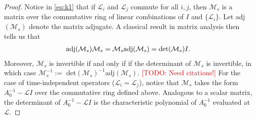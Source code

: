 \documentclass[review]{siamart}
\makeatletter
\newcommand{\todo}[1]{\textcolor{red}{[TODO\@: #1]}}
\makeatother
\begin{document}
%
\begin{proof}
Notice in \eqref{eq:k1} that if $\mathcal{L}_i$ and $\mathcal{L}_j$ commute for all $i,j$,
then $\mathcal{M}_s$ is a matrix over the commutative ring of linear combinations
of $I$ and $\{\mathcal{L}_i\}$. Let adj$(\mathcal{M}_s)$ denote the matrix adjugate. A
classical result in matrix analysis then tells us that
%
\begin{align*} 
\textnormal{adj}(\mathcal{M}_s)\mathcal{M}_s = \mathcal{M}_s\textnormal{adj}(\mathcal{M}_s)
	= \textnormal{det}(\mathcal{M}_s)I.
\end{align*}
%
Moreover, $\mathcal{M}_s$ is invertible if and only if if the determinant of $\mathcal{M}_s$
is invertible, in which case $\mathcal{M}_s^{-1} := $ det$(\mathcal{M}_s)^{-1}$adj$(\mathcal{M}_s)$.
\todo{Need citations!}
For the case of time-independent operators ($\mathcal{L}_i=\mathcal{L}_j$), notice that
$\mathcal{M}_s$ takes the form $A_0^{-1} - \mathcal{L}I$ over the commutative ring defined
above. Analogous to a scalar matrix, the determinant of $A_0^{-1} - \mathcal{L}I$ is the
characteristic polynomial of $A_0^{-1}$ evaluated at $\mathcal{L}$.
\end{proof}
%
\end{document}
